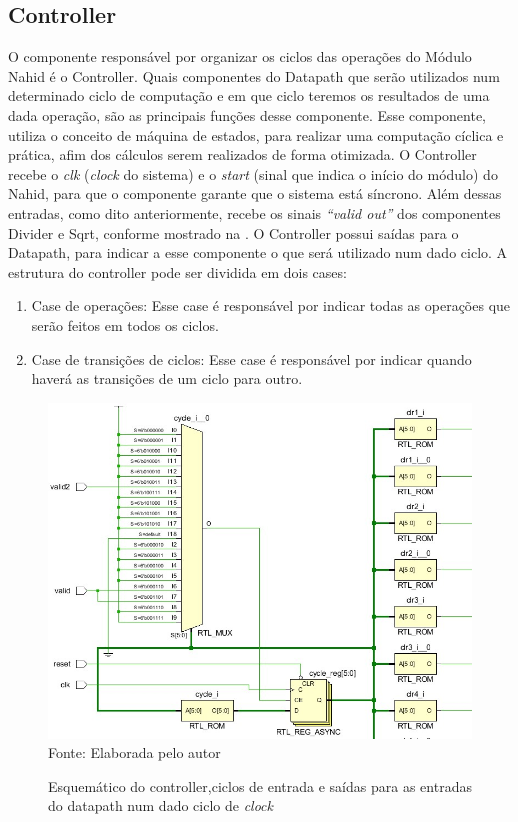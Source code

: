 \subsection{Controller}
O componente responsável por organizar os ciclos das operações do Módulo Nahid é o Controller. Quais componentes do Datapath que serão utilizados num determinado ciclo de computação e em que ciclo teremos os resultados de uma dada operação, são as principais funções desse componente. Esse componente, utiliza o conceito de máquina de estados, para realizar uma computação cíclica e prática, afim dos cálculos serem realizados de forma otimizada. O Controller recebe o \textit{clk} (\textit{clock} do sistema) e o \textit{start} (sinal que indica o início do módulo) do Nahid, para que o componente garante que o sistema está síncrono. Além dessas entradas, como dito anteriormente, recebe os sinais \textit{“valid out”} dos componentes Divider e Sqrt, conforme mostrado na . O Controller possui saídas para o Datapath, para indicar a esse componente o que será utilizado num dado ciclo. A estrutura do controller pode ser dividida em dois cases:
\begin{enumerate}
	\item Case de operações: Esse case é responsável por indicar todas as operações que serão feitos em todos os ciclos. 
	\item Case de transições de ciclos: Esse case é responsável por indicar quando haverá as transições de um ciclo para outro.
\end{enumerate} 

\begin{figure}[H]
	\centering
	\caption{Esquemático do controller,ciclos de entrada e saídas para as  entradas do datapath num dado  ciclo de \textit{clock}}
	\includegraphics[width=15cm]{figures/controller.jpg}\\
	{Fonte: Elaborada pelo autor}	
	\label{esquema}
\end{figure}

